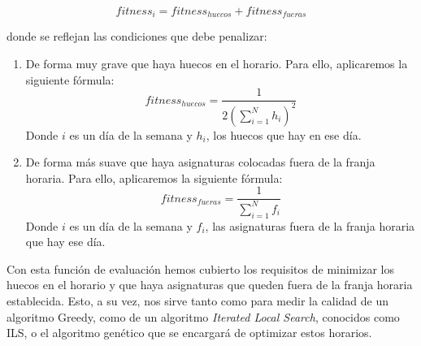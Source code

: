 \begin{displaymath}
    fitness_i = fitness_{huecos} + fitness_{fueras}
\end{displaymath}

donde se reflejan las condiciones que debe penalizar:

\begin{enumerate}[---]
    \item De forma muy grave que haya huecos en el horario. Para ello, aplicaremos la siguiente fórmula:
    \begin{displaymath}
        fitness_{huecos} = \frac{1}{2 \left( \sum_{i = 1}^N h_i \right)^2}
    \end{displaymath}
    Donde $i$ es un día de la semana y $h_i$, los huecos que hay en ese día.
    
    \item De forma más suave que haya asignaturas colocadas fuera de la franja horaria. Para ello, aplicaremos la siguiente fórmula:
    \begin{displaymath}
        fitness_{fueras} = \frac{1}{\sum_{i=1}^N f_i}
    \end{displaymath}
    Donde $i$ es un día de la semana y $f_i$, las asignaturas fuera de la franja horaria que hay ese día.
\end{enumerate}

Con esta función de evaluación hemos cubierto los requisitos de minimizar los huecos en el horario y que haya asignaturas que queden fuera de la franja horaria establecida. Esto, a su vez, nos sirve tanto como para medir la calidad de un algoritmo Greedy, como de un algoritmo \textit{Iterated Local Search}, conocidos como ILS, o el algoritmo genético que se encargará de optimizar estos horarios.
